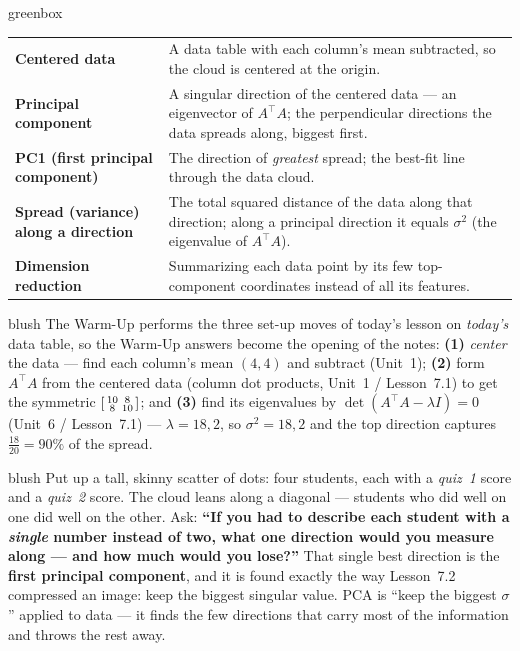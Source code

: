\documentclass[10pt]{article}
\newcommand{\T}{^{\top}}
\begin{document}
\begin{skillbox}{greenbox}
\renewcommand{\arraystretch}{1.3}
\begin{tabularx}{\linewidth}{@{}l X@{}}
\textbf{Centered data} & A data table with each column's mean subtracted, so the cloud is centered at the origin. \\
\textbf{Principal component} & A singular direction of the centered data --- an eigenvector of $A\T A$; the perpendicular directions the data spreads along, biggest first. \\
\textbf{PC1 (first principal component)} & The direction of \emph{greatest} spread; the best-fit line through the data cloud. \\
\textbf{Spread (variance) along a direction} & The total squared distance of the data along that direction; along a principal direction it equals $\sigma^2$ (the eigenvalue of $A\T A$). \\
\textbf{Dimension reduction} & Summarizing each data point by its few top-component coordinates instead of all its features. \\
\end{tabularx}
\end{skillbox}

\begin{fixedskillbox}{blush}
    The Warm-Up performs the three set-up moves of today's lesson on \emph{today's} data table, so the
    Warm-Up answers become the opening of the notes: \textbf{(1)} \emph{center} the data --- find each
    column's mean $(4,4)$ and subtract (Unit~1); \textbf{(2)} form $A\T A$ from the centered data (column
    dot products, Unit~1 / Lesson~7.1) to get the symmetric $\begin{bsmallmatrix} 10 & 8\\ 8 & 10 \end{bsmallmatrix}$;
    and \textbf{(3)} find its eigenvalues by $\det(A\T A-\lambda I)=0$ (Unit~6 / Lesson~7.1) --- $\lambda=18,2$,
    so $\sigma^2=18,2$ and the top direction captures $\tfrac{18}{20}=90\%$ of the spread.
\end{fixedskillbox}

\begin{skillbox}[Hook]{blush}
    Put up a tall, skinny scatter of dots: four students, each with a \emph{quiz~1} score and a \emph{quiz~2}
    score. The cloud leans along a diagonal --- students who did well on one did well on the other. Ask:
    \textbf{``If you had to describe each student with a \emph{single} number instead of two, what one
    direction would you measure along --- and how much would you lose?''} That single best direction is the
    \textbf{first principal component}, and it is found exactly the way Lesson~7.2 compressed an image: keep
    the biggest singular value. PCA is ``keep the biggest $\sigma$'' applied to data --- it finds the few
    directions that carry most of the information and throws the rest away.
\end{skillbox}
\end{document}
